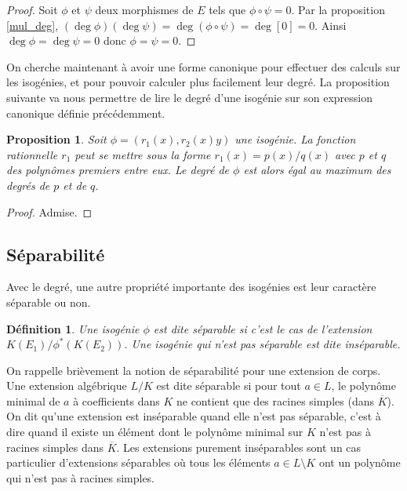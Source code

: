 \documentclass{article}
\theoremstyle{plain}%
\newtheorem{prop}[thm]{Proposition}
\newtheorem{deff}[thm]{Définition}
\theoremstyle{definition}%
\begin{document}
\begin{proof}
  Soit $\phi$ et $\psi$ deux morphismes de $E$ tels que $\phi \circ \psi = 0$. 
Par la proposition \ref{mul_deg}, $(\deg \phi)(\deg \psi) = \deg(\phi \circ \psi) = \deg[0] = 0$. Ainsi $\deg \phi = \deg \psi = 0$ donc $\phi = \psi = 0$.
\end{proof}

On cherche maintenant à avoir une forme canonique pour effectuer des calculs sur les isogénies, et pour pouvoir calculer plus facilement leur degré.
La proposition suivante va nous permettre de lire le degré d'une isogénie sur son expression canonique définie précédemment.

\begin{prop}
  \label{caracdeg}
  Soit $\phi = (r_1(x), r_2(x)y)$ une isogénie. La fonction rationnelle $r_1$ peut se mettre sous la forme $r_1(x) = p(x) / q(x)$ avec $p$ et $q$ des polynômes premiers entre eux. Le degré de $\phi$ est alors égal au maximum des degrés de $p$ et de $q$. 
\end{prop}

\begin{proof}
  Admise. 
\end{proof}

\subsection{Séparabilité}

Avec le degré, une autre propriété importante des isogénies est leur caractère séparable ou non.

\begin{deff}
  Une isogénie $\phi$ est dite séparable si c'est le cas de l'extension $K(E_1) / \phi^*(K(E_2))$. Une isogénie qui n'est pas séparable est dite inséparable.
\end{deff}

On rappelle brièvement la notion de séparabilité pour une extension de corps. Une extension algébrique $L/K$ est dite séparable si pour tout $a\in L$, le polynôme minimal de $a$ à coefficients dans $K$ ne contient que des racines simples (dans $\overline{K}$). On dit qu'une extension est inséparable quand elle n'est pas séparable, c'est à dire quand il existe un élément dont le polynôme minimal sur $K$ n'est pas à racines simples dans $\overline{K}$. Les extensions purement inséparables sont un cas particulier d'extensions séparables où tous les éléments $a\in L \setminus K$ ont un polynôme qui n'est pas à racines simples.
\end{document}
